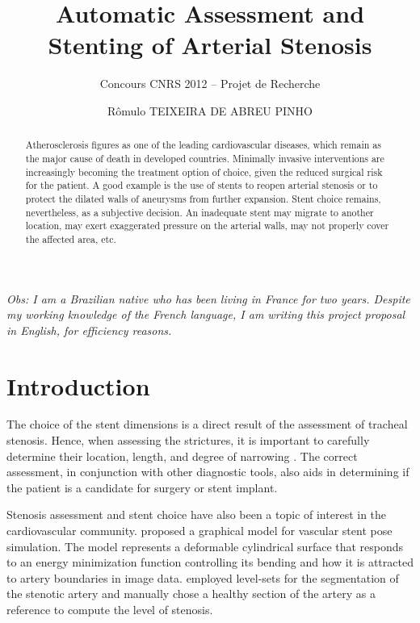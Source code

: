 \documentclass[a4paper]{article}
\title{Automatic Assessment and Stenting of Arterial Stenosis}
\author{Concours CNRS 2012 -- Projet de Recherche}
\date{R\^omulo TEIXEIRA DE ABREU PINHO}
\begin{document}
\maketitle

\begin{noindent}
{\em Obs: I am a Brazilian native who has been living in France for two years. Despite my working knowledge of the French language, I am writing this project proposal in English, for efficiency reasons.}
\end{noindent}

\begin{abstract}
Atherosclerosis figures as one of the leading cardiovascular diseases, which remain as the major cause of death in developed countries. Minimally invasive interventions are increasingly becoming the treatment option of choice, given the reduced surgical risk for the patient. A good example is the use of stents to reopen arterial stenosis or to protect the dilated walls of aneurysms from further expansion. Stent choice remains, nevertheless, as a subjective decision. An inadequate stent may migrate to another location, may exert exaggerated pressure on the arterial walls, may not properly cover the affected area, etc. 
\end{abstract}

\tableofcontents

\section{Introduction}

The choice of the stent dimensions is a direct result of the assessment of tracheal stenosis. Hence, when assessing the strictures, it is important to carefully determine their location, length, and degree of narrowing \citep{Boiselle}. The correct assessment, in conjunction with other diagnostic
tools, also aids in determining if the patient is a candidate for surgery or stent implant.

Stenosis assessment and stent choice have also been a topic of interest in the cardiovascular community. \citet{Florez} proposed a graphical model for vascular stent pose simulation. The model represents a deformable cylindrical surface that responds to an energy minimization function controlling its bending and how it is attracted to artery boundaries in image data. \citet{Bemmel} employed level-sets for the segmentation of the stenotic artery and manually chose a healthy section
of the artery as a reference to compute the level of stenosis.
\end{document}
